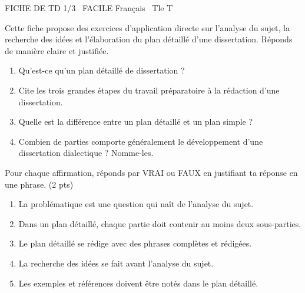 \documentclass[11pt]{article}
\begin{document}
\begin{tcolorbox}[enhanced,colback=popink,colframe=popink,arc=10pt,boxrule=0pt,left=12pt,right=12pt,top=9pt,bottom=9pt]
{\color{white}\popxbold\small FICHE DE TD 1/3 \textbullet\ FACILE \hfill Français \textbullet\ Tle T\par}
\end{tcolorbox}
\vspace{4pt}
Cette fiche propose des exercices d'application directe sur l'analyse du sujet, la recherche des idées et l'élaboration du plan détaillé d'une dissertation. Réponds de manière claire et justifiée.

\begin{exercice}
\begin{enumerate}
\item Qu'est-ce qu'un plan détaillé de dissertation ?
\item Cite les trois grandes étapes du travail préparatoire à la rédaction d'une dissertation.
\item Quelle est la différence entre un plan détaillé et un plan simple ?
\item Combien de parties comporte généralement le développement d'une dissertation dialectique ? Nomme-les.
\end{enumerate}
\end{exercice}

\begin{exercice}
Pour chaque affirmation, réponds par VRAI ou FAUX en justifiant ta réponse en une phrase. (2 pts)
\begin{enumerate}
\item La problématique est une question qui naît de l'analyse du sujet.
\item Dans un plan détaillé, chaque partie doit contenir au moins deux sous-parties.
\item Le plan détaillé se rédige avec des phrases complètes et rédigées.
\item La recherche des idées se fait avant l'analyse du sujet.
\item Les exemples et références doivent être notés dans le plan détaillé.
\end{enumerate}
\end{exercice}
\end{document}
